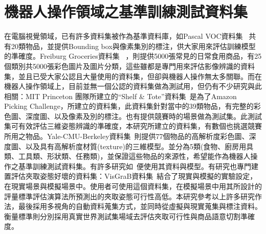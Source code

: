 \section{機器人操作領域之基準訓練測試資料集}
在電腦視覺領域，已有許多資料集被作為基準資料庫，如Pascal VOC資料集 ~\cite{everingham2010pascal}共有20類物品，並提供Bounding box與像素集別的標注，供大家用來評估訓練模型的準確度。Freiburg Groceries資料集 ~\cite{jund2016freiburg}，則提供5000張常見的日常食用商品，有25個類別共5000張彩色圖片及圖片分類，這些雖都是專門用來評估影像辨識的資料集，並且已受大家公認且大量使用的資料集，但卻與機器人操作無太多關聯。而在機器人操作領域上，目前並無一個公認的資料集做為測試用，但仍有不少研究與此相關：MIT Princeton 團隊所建立的``Shelf \& Tote''資料集~\cite{zeng2016multi}是為了Amazon Picking Challenge，所建立的資料集，此資料集針對當中的39類物品，有完整的彩色圖、深度圖、以及像素及別的標注。也有提供競賽時的場景做為測試集。此測試集可有效評估三維姿態辨識的準確度，本研究所建立的資料集，有數個也挑選競賽所用之物品。Yale-CMU-Berkeley資料集~\cite{calli2015benchmarking}則提供77個物品的高解析度彩色圖、深度圖、以及具有高解析度材質(texture)的三維模型。並分為5類(食物、廚房用具類、工具類、形狀類、任務類)，並保證這些物品的來源性，希望能作為機器人操作之基準訓練測試資料集。有許多研究如~\cite{mahler2016dex}便使用其資料與模型。有研究也專門建置評估夾取姿態好壞的資料集：VisGraB資料集~\cite{kootstra2012visgrab}結合了現實與模擬的實驗設定，在現實場景與模擬場景中。使用者可使用這個資料集，在模擬場景中用其所設計的評量標準評估演算法所預測出的夾取姿態可行性高低。本研究參考以上許多研究作法，最後採用多視角的自動資料蒐集方式，並同時從虛擬與現實蒐集與標注資料。衡量標準則分別採用真實世界測試集場域去評估夾取可行性與商品語意切割準確度。

